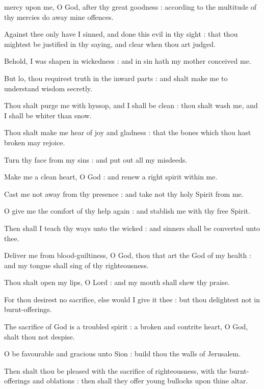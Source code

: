  mercy upon me, O God, after thy great goodness : according to the multitude of thy mercies do away mine offences.\par
{}
Against thee only have I sinned, and done this evil in thy sight : that thou mightest be justified in thy saying, and clear when thou art judged.\par
{}Behold, I was shapen in wickedness : and in sin hath my mother conceived me.\par
{}But lo, thou requirest truth in the inward parts : and shalt make me to understand wisdom secretly.\par
{}Thou shalt purge me with hyssop, and I shall be clean : thou shalt wash me, and I shall be whiter than snow.\par
{}Thou shalt make me hear of joy and gladness : that the bones which thou hast broken may rejoice.\par
{}Turn thy face from my sins : and put out all my misdeeds.\par
{}Make me a clean heart, O God : and renew a right spirit within me.\par
{}Cast me not away from thy presence : and take not thy holy Spirit from me.\par
{}O give me the comfort of thy help again : and stablish me with thy free Spirit.\par
{}Then shall I teach thy ways unto the wicked : and sinners shall be converted unto thee.\par
{}Deliver me from blood-guiltiness, O God, thou that art the God of my health : and my tongue shall sing of thy righteousness.\par
{}Thou shalt open my lips, O Lord : and my mouth shall shew thy praise.\par
{}For thou desirest no sacrifice, else would I give it thee : but thou delightest not in burnt-offerings.\par
{}The sacrifice of God is a troubled spirit : a broken and contrite heart, O God, shalt thou not despise.\par
{}O be favourable and gracious unto Sion : build thou the walls of Jerusalem.\par
{}Then shalt thou be pleased with the sacrifice of righteousness, with the burnt-offerings and oblations : then shall they offer young bullocks upon thine altar.\par


